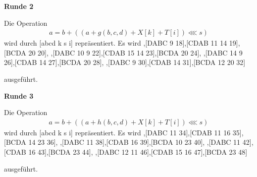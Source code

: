 \documentclass[12pt,a4paper]{scrartcl}
\newcommand{\spar}{\par\vspace{10pt}\noindent}
\numberwithin{equation}{section}
\numberwithin{myalgctr}{section}
\numberwithin{mytheoremctr}{section}
\begin{document}
	\noindent \textbf{Runde 2}\par\noindent
	Die Operation 
	\begin{align*}
	a = b+ ((a + g(b,c,d) + X[k] + T[i])\lll s)
	\end{align*}
	wird durch [abcd k s i] repräsentiert. Es wird
	\vspace{.5cm}
	\newline
	[ABCD \:\:1 5 17],\hfill [DABC \: 9 18],\hfill [CDAB 11 14 19],\hfill [BCDA \: 20 20],
	\newline
	[ABCD \:\:5 5 21],\hfill [DABC 10 9 22],\hfill [CDAB 15 14 23],\hfill [BCDA \: 20 24],
	\newline
	[ABCD \:\:9  5 25],\hfill [DABC 14 9 26],\hfill [CDAB \: 14 27],\hfill [BCDA \: 20 28],
	\newline
	[ABCD 13 5 29],\hfill [DABC \: 9 30],\hfill [CDAB \: 14 31],\hfill [BCDA 12 20 32]\:
	\spar
	ausgeführt.\\
	\vspace{.5cm}
	
	\noindent \textbf{Runde 3}\par\noindent
	Die Operation 
	\begin{align*}
	a = b+ ((a + h(b,c,d) + X[k] + T[i])\lll s)
	\end{align*}
	wird durch [abcd k s i] repräsentiert. Es wird
	\vspace{.5cm}
	\newline
	[ABCD \:\:5 4 33],\hfill [DABC \: 11 34],\hfill [CDAB 11 16 35],\hfill [BCDA 14 23 36],
	\newline
	[ABCD \:\:1 4 37],\hfill [DABC \: 11 38],\hfill [CDAB \: 16 39],\hfill [BCDA 10 23 40],
	\newline
	[ABCD 13  4 41],\hfill [DABC \: 11 42],\hfill [CDAB \: 16 43],\hfill [BCDA \: 23 44],
	\newline
	[ABCD \:\:9 4 45],\hfill [DABC 12 11 46],\hfill [CDAB 15 16 47],\hfill [BCDA \: 23 48]\:
	\spar
	ausgeführt.\\
	\vspace{.5cm}
	
\end{document}

